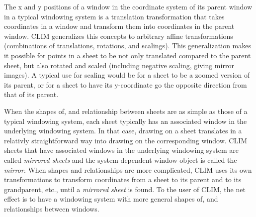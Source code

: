 The x and y positions of a window in the coordinate system of its parent
window in a typical windowing system is a translation transformation
that takes coordinates in a window and transform them into coordinates
in the parent window.  CLIM generalizes this concepts to arbitrary
affine transformations (combinations of translations, rotations, and
scalings).  This generalization makes it possible for points in a sheet
to be not only translated compared to the parent sheet, but also rotated
and scaled (including negative scaling, giving mirror images).  A
typical use for scaling would be for a sheet to be a zoomed version of
its parent, or for a sheet to have its y-coordinate go the opposite
direction from that of its parent.

When the shapes of, and relationship between sheets are as simple as
those of a typical windowing system, each sheet typically has an
associated window in the underlying windowing system.  In that case,
drawing on a sheet translates in a relativly straightforward way into
drawing on the corresponding window.  CLIM sheets that have associated
windows in the underlying windowing system are called \emph{mirrored
sheets} and the system-dependent window object is called the
\emph{mirror}.  When shapes and relationships are more complicated,
CLIM uses its own transformations to transform coordinates from a sheet
to its parent and to its grandparent, etc., until a \emph{mirrored
sheet} is found.  To the user of CLIM, the net effect is to have a
windowing system with more general shapes of, and relationships between
windows.
